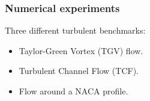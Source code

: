 \begin{frame}[t]
\frametitle{Numerical experiments}
\vfill
Three different turbulent benchmarks:
\begin{itemize}
\item Taylor-Green Vortex (TGV) flow.
\item Turbulent Channel Flow (TCF).
\item Flow around a NACA profile.
\end{itemize}
\vfill
\end{frame}
